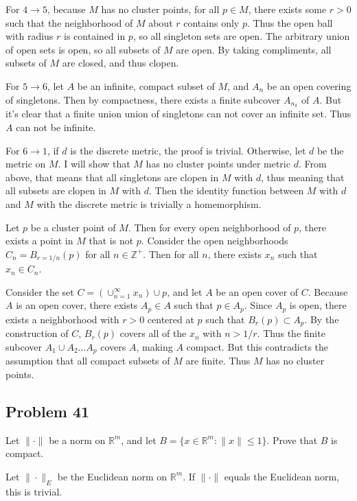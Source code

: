\documentclass{article}
\begin{document}
For $4 \rightarrow 5$, because $M$ has no cluster points, for all $p \in M$, there exists some $r > 0$ such that the neighborhood of $M$ about $r$ contains only $p$. Thus the open ball with radius $r$ is contained in $p$, so all singleton sets are open. The arbitrary union of open sets is open, so all subsets of $M$ are open. By taking compliments, all subsets of $M$ are closed, and thus clopen.

For $5 \rightarrow 6$, let $A$ be an infinite, compact subset of $M$, and $A_n$ be an open covering of singletons. Then by compactness, there exists a finite subcover $A_{n_k}$ of $A$. But it's clear that a finite union union of singletons can not cover an infinite set. Thus $A$ can not be infinite.

For $6 \rightarrow 1$, if $d$ is the discrete metric, the proof is trivial. Otherwise, let $d$ be the metric on $M$. I will show that $M$ has no cluster points under metric $d$. From above, that means that all singletons are clopen in $M$ with $d$, thus meaning that all subsets are clopen in $M$ with $d$. Then the identity function between $M$ with $d$ and $M$ with the discrete metric is trivially a homemorphism.

Let $p$ be a cluster point of $M$. Then for every open neighborhood of $p$, there exists a point in $M$ that is not $p$. Consider the open neighborhoods $C_n = B_{r = 1/n}(p)$ for all $n \in \mathbb{Z}^+$. Then for all $n$, there exists $x_n$ such that $x_n \in C_n$.

Consider the set $C = (\cup_{n=1}^{\infty} x_n) \cup p$, and let $A$ be an open cover of $C$. Because $A$ is an open cover, there exists $A_p \in A$ such that $p \in A_p$. Since $A_p$ is open, there exists a neighborhood with $r > 0$ centered at $p$ such that $B_r(p) \subset A_p$. By the construction of $C$, $B_r(p)$ covers all of the $x_n$ with $n > 1/r$. Thus the finite subcover $A_1 \cup A_2 \dots A_p$ covers $A$, making $A$ compact. But this contradicts the assumption that all compact subsets of $M$ are finite. Thus $M$ has no cluster points.

\subsection*{Problem 41}

Let $\| \cdot \|$ be a norm on $\mathbb{R}^m$, and let $B = \{x\in \mathbb{R}^m: \|x\| \leq 1\}$. Prove that $B$ is compact.

Let $\|\cdot \|_E$ be the Euclidean norm on $\mathbb{R}^m$. If $\| \cdot \|$ equals the Euclidean norm, this is trivial.
\end{document}
